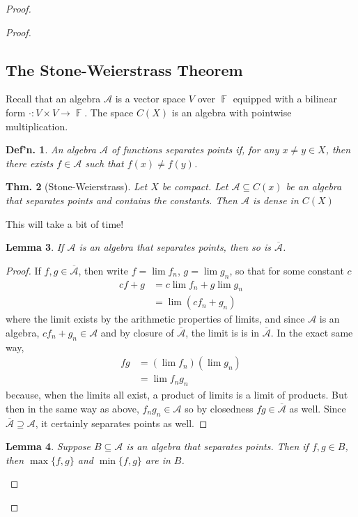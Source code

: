 \documentclass[12pt, a4paper]{book}
\DeclareMathOperator{\F}{\mathbb{F}}
\newtheorem{theorem}{Thm.}[section]
\newtheorem{lemma}[theorem]{Lemma}
\newtheorem{definition}[theorem]{Def'n.}
\theoremstyle{nonumberplain}
\newtheorem{proof}{Proof}
\begin{document}
\begin{proof}
\begin{proof}
\subsection{The Stone-Weierstrass Theorem}
Recall that an algebra $\mathcal{A}$ is a vector space $V$ over $\F$ equipped with a bilinear form $\cdot:V\times V\to\F$.
The space $C(X)$ is an algebra with pointwise multiplication.
\begin{definition}
    An algebra $\mathcal{A}$ of functions separates points if, for any $x\neq y\in X$, then there exists $f\in\mathcal{A}$ such that $f(x)\neq f(y)$.
\end{definition}
\begin{theorem}[Stone-Weierstrass]
    Let $X$ be compact.
    Let $\mathcal{A}\subseteq C(x)$ be an algebra that separates points and contains the constants.
    Then $\mathcal{A}$ is dense in $C(X)$
\end{theorem}
This will take a bit of time!
\begin{lemma}
    If $\mathcal{A}$ is an algebra that separates points, then so is $\overline{\mathcal{A}}$.
\end{lemma}
\begin{proof}
    If $f,g\in\overline{\mathcal{A}}$, then write $f=\lim f_n$, $g=\lim g_n$, so that for some constant $c$
    \begin{align*}
        cf+g &= c\lim f_n+g\lim g_n\\
             &= \lim (cf_n+g_n)
    \end{align*}
    where the limit exists by the arithmetic properties of limits, and since $\mathcal{A}$ is an algebra, $cf_n+g_n\in\mathcal{A}$ and by closure of $\overline{\mathcal{A}}$, the limit is is in $\overline{\mathcal{A}}$.
    In the exact same way,
    \begin{align*}
        fg &= (\lim f_n)(\lim g_n)\\
           &= \lim f_ng_n
    \end{align*}
    because, when the limits all exist, a product of limits is a limit of products.
    But then in the same way as above, $f_ng_n\in\mathcal{A}$ so by closedness $fg\in\overline{\mathcal{A}}$ as well.
    Since $\overline{\mathcal{A}}\supseteq\mathcal{A}$, it certainly separates points as well.
\end{proof}
\begin{lemma}
    Suppose $B\subseteq\mathcal{A}$ is an algebra that separates points.
    Then if $f,g\in B$, then $\max\{f,g\}$ and $\min\{f,g\}$ are in $B$.
\end{lemma}

\end{proof}
\end{proof}
\end{document}
